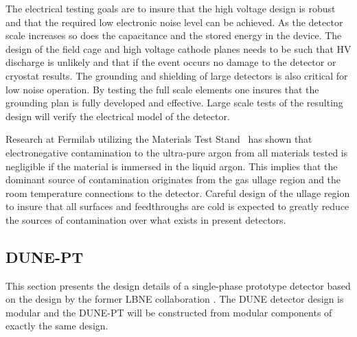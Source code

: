 	 
	 The electrical testing goals are to insure that the high voltage design is robust and that the required low electronic noise level can be achieved. As the detector scale increases so does the capacitance and the stored energy in the device. The design of the field cage and high voltage cathode planes needs to be such that HV discharge is unlikely and that if the event occurs no damage to the detector or cryostat results. The grounding and shielding of large detectors is also critical for low noise operation. By testing the full scale elements one insures that the grounding plan is fully developed and effective. Large scale tests of the resulting design will verify the electrical model of the detector. 

	 Research at Fermilab utilizing the Materials Test Stand~\cite{mat-test-stand} has shown that electronegative contamination to the ultra-pure argon from all materials tested is negligible if the material is immersed in the liquid argon. This implies that the dominant source of contamination originates from the gas ullage region and the room temperature connections to the detector. Careful design of the ullage region to insure that all surfaces and feedthroughs are cold is expected to greatly reduce the sources of contamination over what exists in present detectors. 
	 
\subsection{DUNE-PT}


This section presents the design details of a single-phase prototype detector based on the design by the former LBNE collaboration \cite{LBNE-design}. 
The DUNE detector design is modular and the DUNE-PT will be constructed from modular components of exactly the same design.

